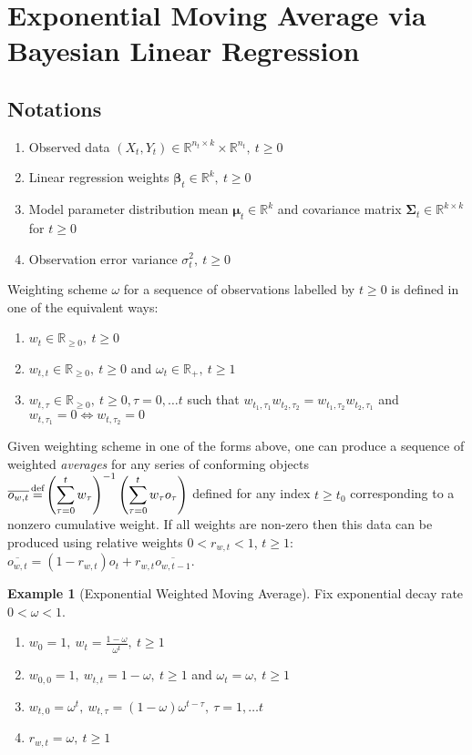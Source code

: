 \documentclass[10pt,fleqn]{amsart}
\theoremstyle{definition}
\newtheorem{example}[theorem]{Example}
\theoremstyle{remark}
\numberwithin{equation}{section}
\newcommand{\RR}{\mathbb{R}}
\newcommand{\eq}{\stackrel{\mathclap{\normalfont\text{def}}}{=}}
\newcommand{\bbeta}{\boldsymbol{\beta}}
\newcommand{\mmu}{\boldsymbol{\mu}}
\newcommand{\SSigma}{\boldsymbol{\Sigma}}
\begin{document}
\section{Exponential Moving Average via Bayesian Linear Regression}
\subsection{Notations}
\begin{enumerate}
    \item Observed data $(X_t, Y_t)\in \RR^{n_t\times k}\times \RR^{n_t},\ t\geq 0$
    \item Linear regression weights $\bbeta_t \in \RR^k,\ t\geq 0$
    \item Model parameter distribution mean $\mmu_t \in \RR^k$ and covariance matrix $\SSigma_t \in \RR^{k\times k}$ for $t\geq 0$
    \item Observation error variance $\sigma_t^2,\ t\geq 0$
\end{enumerate}
Weighting scheme $\omega$ for a sequence of observations labelled by $t\geq 0$ is defined in one of the equivalent ways:
\begin{enumerate}
    \item $w_t\in \RR_{\geq 0},\ t\geq 0$
    \item $w_{t,t}\in \RR_{\geq 0},\ t\geq 0$ and $\omega_t\in \RR_+,\ t\geq 1$
    \item $w_{t,\tau}\in \RR_{\geq 0},\ t\geq 0, \tau=0,\ldots t$ such that $w_{t_1,\tau_1}w_{t_2,\tau_2}=w_{t_1,\tau_2}w_{t_2,\tau_1}$ and $w_{t,\tau_1}=0\Leftrightarrow  w_{t,\tau_2}=0$
\end{enumerate}
Given weighting scheme in one of the forms above, one can produce a sequence of weighted \emph{averages}
for any series of conforming objects
$\displaystyle \overline{o_{w,t}}\eq\left(\sum_{\tau=0}^t w_\tau\right)^{-1}\left(\sum_{\tau=0}^t w_\tau o_\tau\right)$
defined for any index $t\geq t_0$ corresponding to a nonzero cumulative weight.
If all weights are non-zero then this data can be produced using relative weights $0<r_{w,t}<1$, $t\geq 1$:
$\displaystyle \overline{o_{w,t}}=\left(1-r_{w,t}\right)o_t+r_{w,t}\overline{o_{w,t-1}}$.
\begin{example}[Exponential Weighted Moving Average] Fix exponential decay rate $0<\omega<1$.
    \begin{enumerate}
        \item $\displaystyle w_0=1,\ w_t=\frac {1-\omega}{\omega^t},\ t\geq 1$
        \item $\displaystyle w_{0,0}=1,\ w_{t,t}=1-\omega,\ t\geq 1$ and $\omega_t=\omega,\ t\geq 1$
        \item $\displaystyle w_{t,0}=\omega^t,\ w_{t,\tau}=\left(1-\omega\right)\omega^{t-\tau},\ \tau=1,\ldots t$
        \item $r_{w,t}=\omega,\ t\geq 1$
    \end{enumerate}
\end{example}
\end{document}
